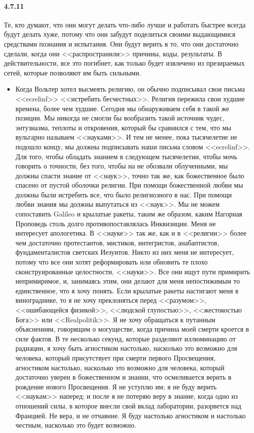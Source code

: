 \paragraph{4.7.11}\hypertarget{par:4.7.11}{}Те, кто думают, что они могут делать что-либо лучше и работать быстрее всегда будут делать хуже, потому что они забудут поделиться своими выдающимися средствами познания и испытания. Они будут верить в то, что они достаточно сделали, когда они <<распространили>> причины, коды, результаты. В действительности, все это погибнет, как только будет извлечено из презираемых сетей, которые позволяют им быть сильными.
	\begin{itemize}
	\item 
	Когда Вольтер хотел высмеять религию, он обычно подписывал свои письма <<ecrelinf>> <<истребить бесчестных>>. Религия пережила свои худшие времена, более чем худшие. Сегодня мы обнаруживаем себя в такой же позиции. Мы никогда не смогли бы вообразить такой источник чудес, энтузиазма, теплоты и откровения, который бы сравнился с тем, что мы вульгарно называем <<науками>>. И тем не менее, пока тысячелетие не подошло концу, мы должны подписывать наши письма словом <<ecrelinf>>. Для того, чтобы обладать знанием в следующем тысячелетии, чтобы мочь говорить о точности, без того, чтобы на не обозвали облученными, мы должны спасти знание от <<наук>>, точно так же, как божественное было спасено от пустой оболочки религии. При помощи божественной любви мы должны были истребить все, что было религиозного в нас. При помощи любви знания мы должны выпутаться из <<наук>>. Мы не можем сопоставить Galileo и крылатые ракеты, таким же образом, каким Нагорная Проповедь столь долго противопоставлялась Инквизиции. Меня не интересует апологетика. В <<науке>> так же, как и в <<религии>> более чем достаточно протестантов, мистиков, интегристов, анабаптистов, фундаменталистов светских Иезуитов. Никто из них меня не интересует, потому что все они хотят реформировать или обновить те плохо сконструированные целостности, <<науки>>. Все они ищут пути примирить непримиримое, и, занимаясь этим, они делают для меня непостижимым то единственное, что я хочу понять. Если крылатые ракеты настигают меня в винограднике, то я не хочу преклоняться перед <<разумом>>, <<ошибающейся физикой>>, <<людской глупостью>>, <<жестокостью Бога>> или <<Realpolitik>>. Я не хочу обращаться к путанным объяснениям, говорящим о могуществе, когда причина моей смерти кроется в силе фактов. В те несколько секунд, которые разделяют иллюминацию от радиации, я хочу быть агностиком настолько, насколько это возможно для человека, который присутствует при смерти первого Просвещения, агностиком настолько, насколько это возможно для человека, который достаточно уверен в божественном и знании, что осмеливается верить в рождение нового Просвещения. Я не уступлю им; я не буду верить <<наукам>> наперед; и после я не потеряю веру в знание, когда одно из отношений силы, в которое внесли свой вклад лаборатории, разорвется над Францией. Не вера, и не отчаяние. Я буду настолько агностиком и настолько честным, насколько это будет возможно.
	\end{itemize}